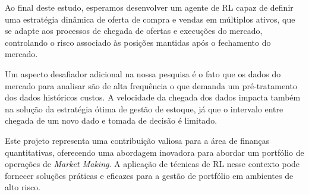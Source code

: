 Ao final deste estudo, esperamos desenvolver um agente de RL capaz de definir uma estratégia dinâmica de oferta de compra e vendas em múltiplos ativos, que se adapte aos processos de chegada de ofertas e execuções do mercado, controlando o risco associado às posições mantidas após o fechamento do mercado.

Um aspecto desafiador adicional na nossa pesquisa é o fato que os dados do mercado para analisar são de alta frequência o que demanda um pré-tratamento dos dados históricos custos. A velocidade da chegada dos dados impacta também na solução da estratégia ótima de gestão de estoque, já que o intervalo entre chegada de um novo dado e tomada de decisão é limitado.

Este projeto representa uma contribuição valiosa para a área de finanças quantitativas, oferecendo uma abordagem inovadora para abordar um portfólio de operações de \textit{Market Making}. A aplicação de técnicas de RL nesse contexto pode fornecer soluções práticas e eficazes para a gestão de portfólio em ambientes de alto risco.